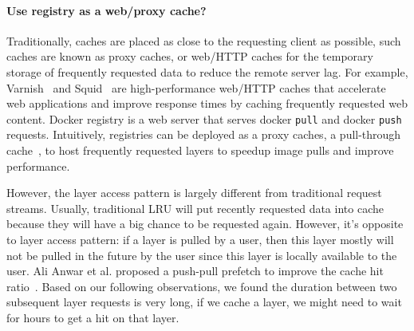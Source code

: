 \paragraph{Use registry as a web/proxy cache?}
Traditionally, caches are placed as close to the requesting client as possible, 
such caches are known as proxy caches, or web/HTTP caches for the temporary storage of 
frequently requested data to reduce the remote server lag. 
For example, Varnish~\cite{varnish} and Squid~\cite{squid} are high-performance web/HTTP caches that accelerate web applications and improve response times by caching frequently requested web content.
Docker registry is a web server that serves docker \texttt{pull} and docker \texttt{push} requests.
Intuitively, registries can be deployed as a proxy caches, \ie a pull-through cache~\cite{registryascache}, to host frequently requested layers to speedup image pulls and improve performance. 

However, the layer access pattern is largely different from traditional request streams.
Usually, traditional LRU will put recently requested data into cache 
because they will have a big chance to be requested again.
However, it's opposite to layer access pattern: if a layer is pulled by a user,
then this layer mostly will not be pulled in the future by the user 
since this layer is locally available to the user.
Ali Anwar et al. proposed a push-pull prefetch to improve the cache hit ratio~\cite{dockerworkload}.
Based on our following observations, we found the duration between two subsequent layer requests is very long,
if we cache a layer, we might need to wait for hours to get a hit on that layer.





